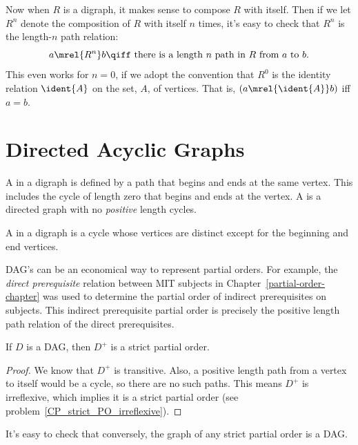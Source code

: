 Now when $R$ is a digraph, it makes sense to compose $R$ with itself.
Then if we let $R^n$ denote the composition of $R$ with itself $n$
times, it's easy to check that $R^n$ is the length-$n$ path relation:
\[
a  \mrel{R^n} b \qiff \mbox{ there is a length $n$ path in $R$ from $a$ to $b$}.
\]
This even works for $n=0$, if we adopt the convention that $R^0$ is
the identity relation $\ident{A}$ on the set, $A$, of vertices.  That
is, $(a \mrel{\ident{A}} b)$ iff $a = b$.

\section{Directed Acyclic Graphs}\label{sec:dag}

\begin{definition}
A  in a digraph is defined by a path that begins and ends
at the same vertex.  This includes the cycle of length zero that
begins and ends at the vertex.  A 
is a directed graph with no \emph{positive} length cycles.

A  in a digraph is a cycle whose vertices are distinct
except for the beginning and end vertices.
\end{definition}

DAG's can be an economical way to represent partial orders.  For
example, the \emph{direct prerequisite} relation between MIT subjects
in Chapter~\ref{partial-order-chapter} was used to determine the
partial order of indirect prerequisites on subjects.  This indirect
prerequisite partial order is precisely the positive length path
relation of the direct prerequisites.

\begin{lemma}
If $D$ is a DAG, then $D^+$ is a strict partial order.
\end{lemma}

\begin{proof}
We know that $D^+$ is transitive.  Also, a positive length path from a
vertex to itself would be a cycle, so there are no such paths.  This means
$D^+$ is irreflexive, which implies it is a strict partial order (see
problem~\ref{CP_strict_PO_irreflexive}).
\end{proof}

It's easy to check that conversely, the graph of any strict partial
order is a DAG.

